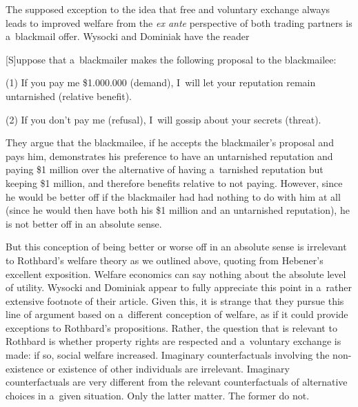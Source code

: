 The supposed exception to the idea that free and voluntary exchange always leads to improved welfare from the \textit{ex ante} perspective of both trading partners is a~blackmail offer. Wysocki and Dominiak 
\parencite*[][p.22]{wysocki_how_2023} %
 have the reader



[S]uppose that a~blackmailer makes the following proposal to the blackmailee:



(1) If you pay me \$1.000.000 (demand), I~will let your reputation remain untarnished (relative benefit).



(2) If you don't pay me (refusal), I~will gossip about your secrets (threat).



They argue that the blackmailee, if he accepts the blackmailer's proposal and pays him, demonstrates his preference to have an untarnished reputation and paying \$1 million over the alternative of having a~tarnished reputation but keeping \$1 million, and therefore benefits relative to not paying. However, since he would be better off if the blackmailer had had nothing to do with him at all (since he would then have both his \$1 million and an untarnished reputation), he is not better off in an absolute sense.



But this conception of being better or worse off in an absolute sense is irrelevant to Rothbard's welfare theory as we outlined above, quoting from Hebener's 
\parencite*[][p.63]{} %
 excellent exposition. Welfare economics can say nothing about the absolute level of utility. Wysocki and Dominiak 
\parencite*[][fn. 12]{wysocki_how_2023} %
 appear to fully appreciate this point in a~rather extensive footnote of their article. Given this, it is strange that they pursue this line of argument based on a~different conception of welfare, as if it could provide exceptions to Rothbard's propositions. Rather, the question that is relevant to Rothbard is whether property rights are respected and a~voluntary exchange is made: if so, social welfare increased. Imaginary counterfactuals involving the non-existence or existence of other individuals are irrelevant. Imaginary counterfactuals are very different from the relevant counterfactuals of alternative choices in a~given situation. Only the latter matter. The former do not.



